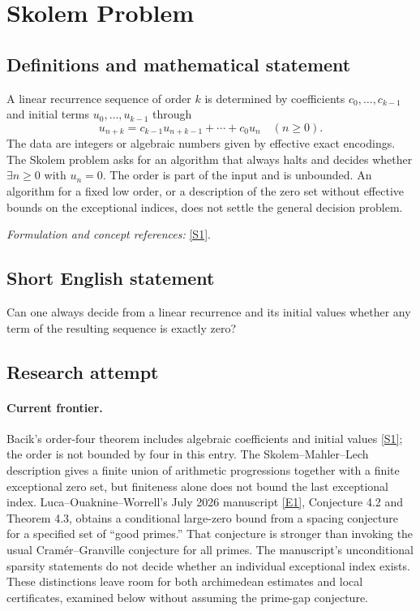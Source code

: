 \documentclass[11pt,a4paper]{article}
\newcommand{\sref}[2]{\hyperlink{source:#1:#2}{[S#2]}}
\newcommand{\eref}[2]{\hyperlink{extra:#1:#2}{[E#2]}}
\newif\ifshowcatalogue
\newcommand{\cataloguescope}[1]{\ifshowcatalogue
 \paragraph{Exact scope in the supplied catalogue.}
 \begin{quote}\small #1\end{quote}\fi}
\begin{document}
\setcounter{section}{0}
\clearpage
\section*{\texorpdfstring{Skolem Problem}{Skolem Problem}}\label{1268}
\subsection{Definitions and mathematical statement}
A linear recurrence sequence of order $k$ is determined by coefficients $c_0,\ldots,c_{k-1}$ and initial terms $u_0,\ldots,u_{k-1}$ through
\[
 u_{n+k}=c_{k-1}u_{n+k-1}+\cdots+c_0u_n\quad(n\ge0).
\]
The data are integers or algebraic numbers given by effective exact encodings. The Skolem problem asks for an algorithm that always halts and decides whether $\exists n\ge0$ with $u_n=0$. The order is part of the input and is unbounded. An algorithm for a fixed low order, or a description of the zero set without effective bounds on the exceptional indices, does not settle the general decision problem.
\par\smallskip\textit{Formulation and concept references:} \sref{1268}{1}.
\cataloguescope{Decide algorithmically, given an integer (or algebraic) linear recurrence sequence, whether it has a zero term.}
\subsection{Short English statement}
Can one always decide from a linear recurrence and its initial values whether any term of the resulting sequence is exactly zero?
\subsection{Research attempt}

\paragraph{Current frontier.}
Bacik's order-four theorem includes algebraic coefficients and initial
values \sref{1268}{1}; the order is not bounded by four in this entry.
The Skolem--Mahler--Lech description gives a finite union of arithmetic
progressions together with a finite exceptional zero set, but finiteness
alone does not bound the last exceptional index. Luca--Ouaknine--Worrell's
July 2026 manuscript \eref{1268}{1}, Conjecture 4.2 and Theorem 4.3, obtains
a conditional large-zero bound from a spacing conjecture for a specified
set of ``good primes.'' That conjecture is stronger than invoking the
usual Cram\'er--Granville conjecture for all primes. The manuscript's
unconditional sparsity statements do not decide whether an individual
exceptional index exists. These distinctions leave room for both
archimedean estimates and local certificates, examined below without
assuming the prime-gap conjecture.
\end{document}
